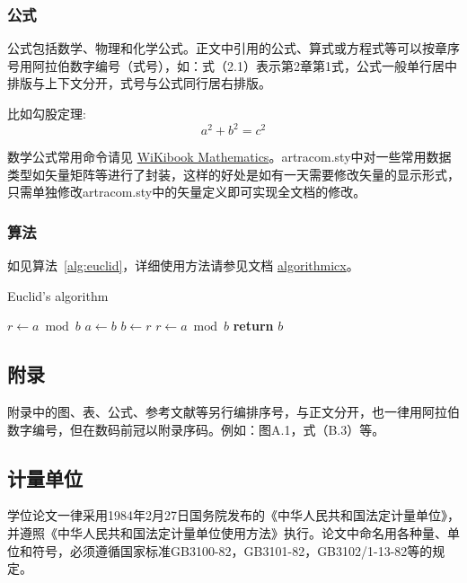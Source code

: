 \subsubsection{公式}
公式包括数学、物理和化学公式。正文中引用的公式、算式或方程式等可以按章序号用阿拉伯数字编号（式号），如：式（2.1）表示第2章第1式，公式一般单行居中排版与上下文分开，式号与公式同行居右排版。

比如勾股定理:
\begin{equation}
    a^2+b^2=c^2
\end{equation}

数学公式常用命令请见 \href{https://en.wikibooks.org/wiki/LaTeX/Mathematics}{WiKibook Mathematics}。artracom.sty中对一些常用数据类型如矢量矩阵等进行了封装，这样的好处是如有一天需要修改矢量的显示形式，只需单独修改artracom.sty中的矢量定义即可实现全文档的修改。

\subsubsection{算法}

如见算法~\ref{alg:euclid}，详细使用方法请参见文档 \href{https://ctan.org/pkg/algorithmicx?lang=en}{algorithmicx}。

\begin{algorithm}[!htbp]
    \small
    \caption{Euclid's algorithm}\label{alg:euclid}
    \begin{algorithmic}[1]
        \State $r\gets a\bmod b$
        \State $a\gets b$
        \State $b\gets r$
        \State $r\gets a\bmod b$
        \EndWhile\label{euclidendwhile}
        \State \textbf{return} $b$
        \EndProcedure
    \end{algorithmic}
\end{algorithm}

\subsection{附录}
附录中的图、表、公式、参考文献等另行编排序号，与正文分开，也一律用阿拉伯数字编号，但在数码前冠以附录序码。例如：图A.1，式（B.3）等。
\subsection{计量单位}
学位论文一律采用1984年2月27日国务院发布的《中华人民共和国法定计量单位》，并遵照《中华人民共和国法定计量单位使用方法》执行。论文中命名用各种量、单位和符号，必须遵循国家标准GB3100-82，GB3101-82，GB3102/1-13-82等的规定。


